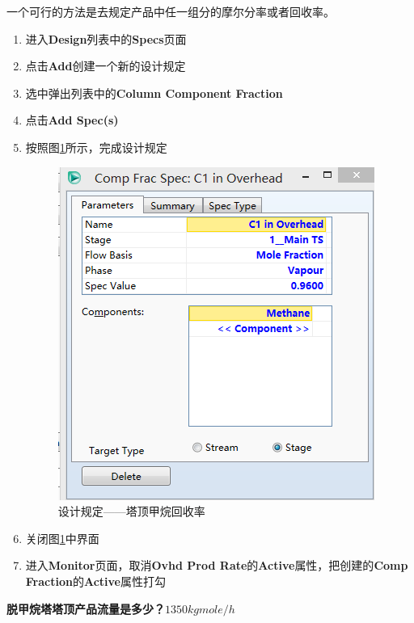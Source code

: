 \documentclass[UTF8]{ctexart}
\begin{document}
一个可行的方法是去规定产品中任一组分的摩尔分率或者回收率。
\begin{enumerate}
	\item 进入\textbf{Design}列表中的\textbf{Specs}页面
	\item 点击\textbf{Add}创建一个新的设计规定
	\item 选中弹出列表中的\textbf{Column Component Fraction}
	\item 点击\textbf{Add Spec(s)}
	\item 按照图\ref{figure6}所示，完成设计规定
	\begin{figure}[h]
	\centering
	\includegraphics[scale=0.3]{DC1_Design.PNG}
	\caption{设计规定——塔顶甲烷回收率}
	\label{figure6}
	\end{figure}
	\item 关闭图\ref{figure6}中界面
	\item 进入\textbf{Monitor}页面，取消\textbf{Ovhd Prod Rate}的\textbf{Active}属性，把创建的\textbf{Comp Fraction}的\textbf{Active}属性打勾
\end{enumerate}

\textbf{脱甲烷塔塔顶产品流量是多少？}\underline{$1350kgmole/h$}
\end{document}
